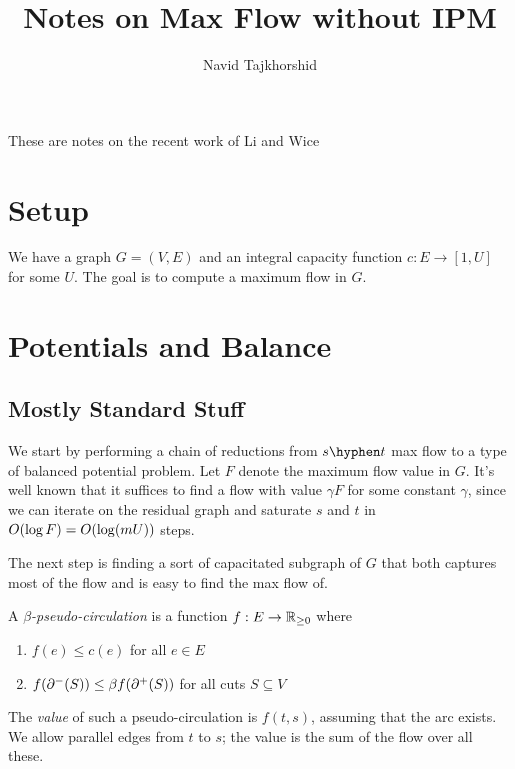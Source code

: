 \documentclass[12 pt]{article}
\begin{document}
\title{Notes on Max Flow without IPM}
\author{Navid Tajkhorshid}

\maketitle

These are notes on the recent work of Li and Wice~\cite{LW26}

\section{Setup}

We have a graph $G = (V, E)$ and an integral capacity function
$c : E \to [1, U]$ for some $U$. The goal is to compute a maximum flow in $G$.

\section{Potentials and Balance}

\subsection{Mostly Standard Stuff}

We start by performing a chain of reductions from $s \hyphen t$ max flow to a
type of balanced potential problem. Let $F$ denote the maximum flow value in
$G$. It's well known that it suffices to find a flow with value $\gamma F$ for
some constant $\gamma$, since we can iterate on the residual graph and saturate
$s$ and $t$ in $\bigO{\log F} = \bigO{\log(mU)}$ steps.

The next step is finding a sort of capacitated subgraph of $G$ that both
captures most of the flow and is easy to find the max flow of.

\begin{definition}
  A \emph{$\beta$-pseudo-circulation} is a function $f : E \to \mathbb{R}_{\geq 0}$
  where
  \begin{enumerate}
    \item $f(e) \leq c(e)$ for all $e \in E$
    \item $f(\incut{S}) \leq \beta f(\outcut{S})$ for all cuts $S \subseteq V$
  \end{enumerate}
  The \emph{value} of such a pseudo-circulation is $f(t, s)$, assuming that the
  arc exists. We allow parallel edges from $t$ to $s$; the value is the sum of
  the flow over all these.
\end{definition}
\end{document}

